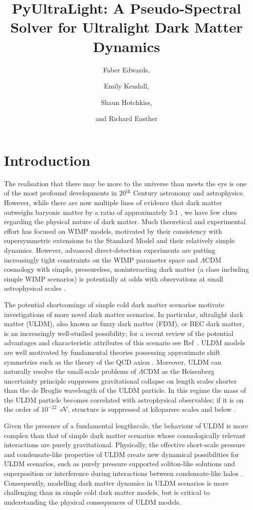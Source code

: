 \documentclass[a4paper,11pt]{article}
\title{ PyUltraLight: A Pseudo-Spectral Solver for Ultralight Dark Matter Dynamics}
\author[]{Faber Edwards,}
\author[]{Emily Kendall,}
\author[]{Shaun Hotchkiss,}
\author[]{and Richard Easther}
\affiliation[]{Department of Physics, University of Auckland, Private Bag 92019, Auckland, New Zealand}
\begin{document}
\maketitle
\flushbottom

\section{Introduction}
\label{sec:intro}

The realisation that there may be more to the universe than meets the eye is one of the most profound developments in 20$^{\textrm{th}}$ Century astronomy and astrophysics. However, while there are now multiple lines of evidence that dark matter outweighs baryonic matter by a ratio of approximately 5:1 \cite{Planck2015}, we have few clues regarding the physical nature of dark matter.  Much theoretical and experimental effort has focused on  WIMP models, motivated by their consistency with supersymmetric extensions to the Standard Model and their relatively simple dynamics. However, advanced direct-detection experiments are putting increasingly tight constraints on the WIMP parameter space \cite{Tan2016, Akerib2017} and $\Lambda$CDM cosmology with simple, pressureless, noninteracting dark matter (a class including simple WIMP scenarios) is potentially at odds with observations at small astrophysical scales \cite{Bull2016}.  

The potential shortcomings of simple cold dark matter scenarios motivate investigations of more novel dark matter scenarios. In particular, ultralight dark matter (ULDM), also known as fuzzy dark matter (FDM), or BEC dark matter, is an increasingly well-studied possibility; for a recent review of the potential advantages and characteristic attributes of this scenario see Ref~\cite{Hui2016}. ULDM models are well motivated by fundamental theories possessing approximate shift symmetries such as the theory of the QCD axion \cite{Kim2010, Marsh2016}. Moreover, ULDM can naturally resolve the small-scale problems of $\Lambda$CDM as the Heisenberg uncertainty principle suppresses gravitational collapse on length scales shorter than the de Broglie wavelength of the ULDM particle. In this regime the mass of the ULDM particle becomes correlated with astrophysical observables; if it is on the order of $10^{-22}$~eV, structure is suppressed at kiloparsec scales and below \cite{Hu2000}. 


Given the presence of a fundamental  lengthscale, the behaviour of ULDM is more complex than that of simple dark matter scenarios whose cosmologically relevant interactions are purely gravitational. Physically, the effective short-scale pressure and  condensate-like properties of ULDM  create new dynamical possibilities for ULDM scenarios, such as  purely pressure supported soliton-like solutions  \cite{Marsh2015} and superposition or interference during interactions between condensate-like halos \cite{Schwabe2016}. Consequently, modelling dark matter dynamics in ULDM scenarios is more challenging than in simple cold dark matter models, but is critical to understanding the physical consequences of ULDM models. 
\end{document}
